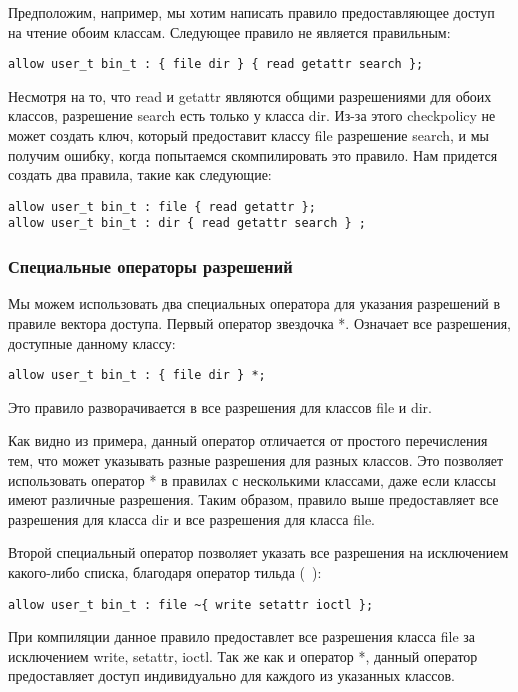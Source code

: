 \documentclass{./../class/UIR}
\begin{document}
Предположим, например, мы хотим написать правило предоставляющее доступ на
чтение обоим классам. Следующее правило не является правильным:

\begin{verbatim}
allow user_t bin_t : { file dir } { read getattr search };
\end{verbatim}

Несмотря на то, что read и getattr являются общими разрешениями для обоих
классов, разрешение search есть только у класса dir. Из-за этого checkpolicy не
может создать ключ, который предоставит классу file разрешение search, и мы
получим ошибку, когда попытаемся скомпилировать это правило. Нам придется
создать два правила, такие как следующие:

\begin{verbatim}
allow user_t bin_t : file { read getattr };
allow user_t bin_t : dir { read getattr search } ;
\end{verbatim}

\subsubsection{Специальные операторы разрешений}

Мы можем использовать два специальных оператора для указания разрешений в
правиле вектора доступа. Первый оператор звездочка *. Означает все разрешения,
доступные данному классу:

\begin{verbatim}
allow user_t bin_t : { file dir } *;
\end{verbatim}

Это правило разворачивается в все разрешения для классов file и dir.

Как видно из примера, данный оператор отличается от простого перечисления тем,
что может указывать разные разрешения для разных классов. Это позволяет
использовать оператор  * в правилах с несколькими классами, даже если классы
имеют различные разрешения. Таким образом, правило выше предоставляет все
разрешения для класса dir и все разрешения для класса file.

Второй специальный оператор позволяет указать все разрешения на исключением
какого-либо списка, благодаря оператор тильда (~):

\begin{verbatim}
allow user_t bin_t : file ~{ write setattr ioctl };
\end{verbatim}

При компиляции данное правило предоставлет все разрешения класса file за
исключением write, setattr, ioctl. Так же как и оператор *, данный оператор
предоставляет доступ индивидуально для каждого из указанных классов.
\end{document}
